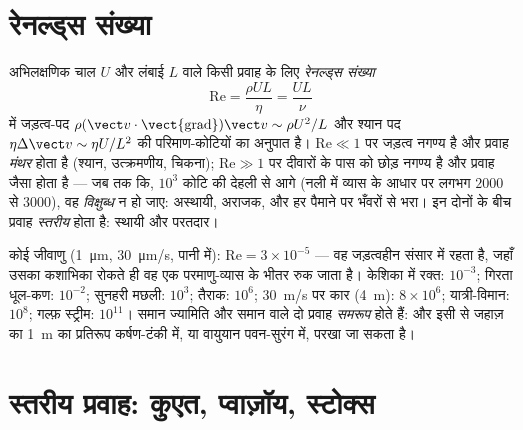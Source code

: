\section{रेनल्ड्स संख्या}

\begin{definition}[रेनल्ड्स संख्या]\label{def:b2:viscous-flows:reynolds}
अभिलक्षणिक चाल $U$ और लंबाई $L$ वाले किसी प्रवाह के लिए \emph{रेनल्ड्स
संख्या}
\[
\mathrm{Re} = \frac{\rho UL}{\eta} = \frac{UL}{\nu}
\]
 में जड़त्व-पद
$\rho(\vect v\cdot\operatorname{\vect{grad}})\vect v \sim \rho U^2/L$ और
श्यान पद $\eta\Delta\vect v \sim \eta U/L^2$ की परिमाण-कोटियों का
अनुपात है। $\mathrm{Re} \ll 1$ पर जड़त्व नगण्य है और प्रवाह
\emph{मंथर} होता है (श्यान, उत्क्रमणीय, चिकना); $\mathrm{Re} \gg 1$ पर
 दीवारों के पास को छोड़ नगण्य है और प्रवाह 
जैसा होता है --- जब तक कि, $10^3$ कोटि की देहली से आगे (नली में व्यास के
आधार पर लगभग $2000$ से $3000$), वह \emph{विक्षुब्ध} न हो जाए:
अस्थायी, अराजक, और हर पैमाने पर भँवरों से भरा। इन दोनों के बीच
प्रवाह \emph{स्तरीय} होता है: स्थायी और परतदार।
\end{definition}

\begin{example}[रोज़मर्रा के प्रवाहों की रेनल्ड्स संख्याएँ]\label{ex:b2:viscous-flows:revalues}
कोई जीवाणु (\qty{1}{\micro m}, \qty{30}{\micro m/s}, पानी में): $\mathrm{Re} =
3 \times 10^{-5}$ --- वह जड़त्वहीन संसार में रहता है, जहाँ उसका
कशाभिका रोकते ही वह एक परमाणु-व्यास के भीतर रुक जाता है। केशिका में रक्त:
$10^{-3}$; गिरता धूल-कण: $10^{-2}$; सुनहरी मछली: $10^3$; तैराक:
$10^6$; \qty{30}{m/s} पर कार (\qty{4}{m}): $8 \times 10^6$; यात्री-विमान: $10^8$;
गल्फ़ स्ट्रीम: $10^{11}$। समान ज्यामिति और समान
 वाले दो प्रवाह \emph{समरूप} होते हैं: और इसी से जहाज़ का
\qty{1}{m} का प्रतिरूप कर्षण-टंकी में, या वायुयान पवन-सुरंग में, परखा जा सकता है।
\end{example}

\section{स्तरीय प्रवाह: कुएत, प्वाज़ॉय, स्टोक्स}

